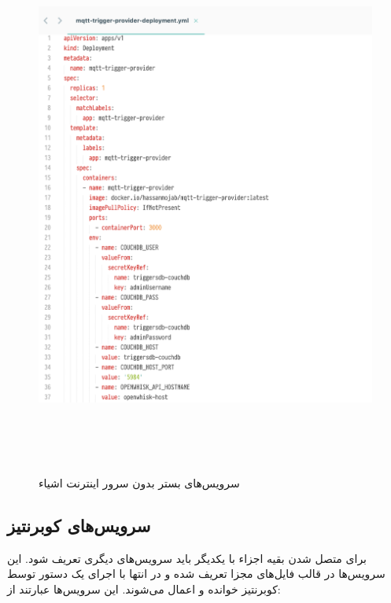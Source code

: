 \begin{figure}[!h]
	\centering
	\includegraphics[height=18cm]{images/deployment-yml}
	\caption{سرویس‌های بستر بدون سرور اینترنت اشیاء}
	\label{deployment-yml}
\end{figure}

\subsection{سرویس‌های کوبرنتیز}

برای متصل شدن بقیه اجزاء با یکدیگر باید سرویس‌های دیگری تعریف شود. این سرویس‌ها در قالب فایل‌های مجزا تعریف شده و در انتها با اجرای یک دستور  توسط کوبرنتیز خوانده و اعمال می‌شوند. این سرویس‌ها عبارتند از:


